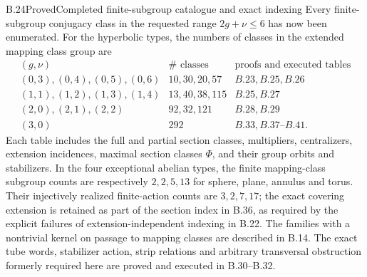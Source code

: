\begin{claim}{B.24}{Proved}{Completed finite-subgroup catalogue and exact indexing}
Every finite-subgroup conjugacy class in the requested range
$2g+\nu\le6$ has now been enumerated.  For the hyperbolic types,
the numbers of classes in the extended mapping class group are
\[
\begin{array}{c|r|l}
 (g,\nu)&\#\text{ classes}&\text{proofs and executed tables}\\\hline
 (0,3),(0,4),(0,5),(0,6)&10,30,20,57&B.23,B.25,B.26\\
 (1,1),(1,2),(1,3),(1,4)&13,40,38,115&B.25,B.27\\
 (2,0),(2,1),(2,2)&92,32,121&B.28,B.29\\
 (3,0)&292&B.33,B.37\text{--}B.41.
\end{array}                                             \tag{B.24.1}
\]
Each table includes the full and partial section classes, multipliers,
centralizers, extension incidences, maximal section classes $\Phi$,
and their group orbits and stabilizers.  In the four exceptional
abelian types, the finite mapping-class subgroup counts are
respectively $2,2,5,13$ for sphere, plane, annulus and torus.  Their
injectively realized finite-action counts are $3,2,7,17$; the exact
covering extension is retained as part of the section index in B.36,
as required by the explicit failures of extension-independent indexing
in B.22.  The families with a nontrivial kernel on passage to mapping
classes are described in B.14.
The exact tube words, stabilizer action, strip relations and arbitrary
transversal obstruction formerly required here are proved and executed
in B.30--B.32.
\end{claim}
